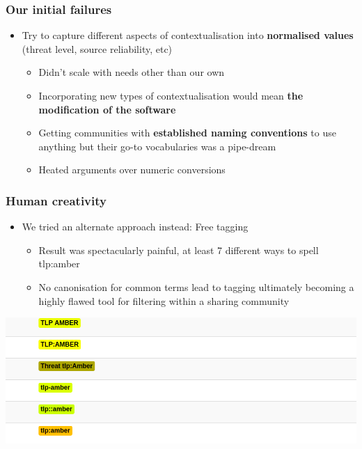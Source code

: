 \begin{frame}
\frametitle{Our initial failures}
\begin{itemize}
       \item Try to capture different aspects of contextualisation into {\bf normalised values} (threat level, source reliability, etc)
        \begin{itemize}
                \item Didn't scale with needs other than our own
                \item Incorporating new types of contextualisation would mean {\bf the modification of the software}
                \item Getting communities with {\bf established naming conventions} to use anything but their go-to vocabularies was a pipe-dream
                \item Heated arguments over numeric conversions
        \end{itemize}
\end{itemize}
\end{frame}

\begin{frame}
  \frametitle{Human creativity}
  \begin{itemize}
    \item We tried an alternate approach instead: Free tagging
    \begin{itemize}
      \item Result was spectacularly painful, at least 7 different ways to spell tlp:amber
      \item No canonisation for common terms lead to tagging ultimately becoming a highly flawed tool for filtering within a sharing community
    \end{itemize}
  \end{itemize}
  \begin{center}
    \includegraphics[scale=0.45]{creativity.png}
  \end{center}
\end{frame}

